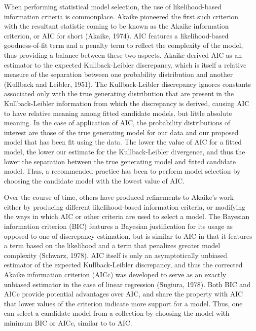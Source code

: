 		When performing statistical model selection, the use of likelihood-based information criteria is commonplace. Akaike pioneered the first such criterion
		with the resultant statistic coming to be known as the Akaike information criterion, or AIC for short (Akaike, 1974). AIC features a likelihood-based goodness-of-fit term and a
		penalty term to reflect the complexity of the model, thus providing a balance between these two aspects. Akaike derived AIC as an estimator to the expected Kullback-Leibler discrepancy,
		which is itself a relative measure of the separation between one probability distribution and another (Kullback and Leibler, 1951). The Kullback-Leibler discrepancy ignores constants
		associated only with the true generating distribution that are present in the Kullback-Leibler information from which the discrepancy is derived, causing AIC to have relative meaning among
		fitted candidate models, but little absolute meaning. In the case of application of AIC, the probability distributions of interest are those of the true generating model
		for our data and our proposed model that has been fit using the data. The lower the value of AIC for a fitted model, the lower our estimate for the Kullback-Leibler divergence,
		and thus the lower the separation between the true generating model and fitted candidate model. Thus, a recommended practice has been to perform model selection by choosing
		the candidate model with the lowest value of AIC.

		Over the course of time, others have produced refinements to Akaike's work either by producing different likelihood-based information criteria, or modifying the ways in which AIC or other
		criteria are used to select a model. The Bayesian information criterion (BIC) features a Bayesian justification for its usage as opposed to one of discrepancy estimation, but is similar to AIC in that
		it features a term based on the likelihood and a term that penalizes greater model complexity (Schwarz, 1978). AIC itself is only an asymptotically unbiased estimator of the expected Kullback-Leibler discrepancy,
		and thus the corrected Akaike information criterion (AICc) was developed to serve as an exactly unbiased estimator in the case of linear regression (Sugiura, 1978).
		Both BIC and AICc provide potential advantages over AIC, and share the property with AIC that lower values of the criterion indicate more support for a model. Thus, one can select a candidate model
		from a collection by choosing the model with minimum BIC or AICc, similar to to AIC.

